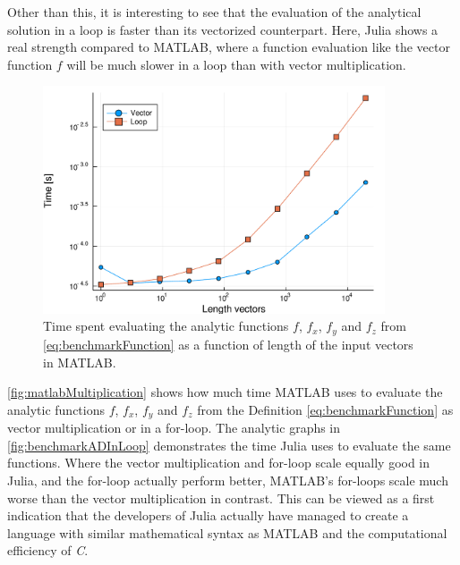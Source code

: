 Other than this, it is interesting to see that the evaluation of the analytical solution in a loop is faster than its vectorized counterpart. Here, Julia shows a real strength compared to MATLAB, where a function evaluation like the vector function $f$ will be much slower in a loop than with vector multiplication.
\begin{figure}[H]
    \centering
    \includegraphics[width = 0.9\textwidth]{figures/benchmark_matlab_multiplication.pdf}
    \caption{Time spent evaluating the analytic functions $f$, $f_x$, $f_y$ and $f_z$ from \eqref{eq:benchmarkFunction} as a function of length of the input vectors in MATLAB.}
    \label{fig:matlabMultiplication}
\end{figure}
\autoref{fig:matlabMultiplication} shows how much time MATLAB uses to evaluate the analytic functions $f$, $f_x$, $f_y$ and $f_z$ from the Definition \eqref{eq:benchmarkFunction} as vector multiplication or in a for-loop. The analytic graphs in \autoref{fig:benchmarkADInLoop} demonstrates the time Julia uses to evaluate the same functions. Where the vector multiplication and for-loop scale equally good in Julia, and the for-loop actually perform better, MATLAB's for-loops scale much worse than the vector multiplication in contrast. This can be viewed as a first indication that the developers of Julia actually have managed to create a language with similar mathematical syntax as MATLAB and the computational efficiency of \textit{C}.